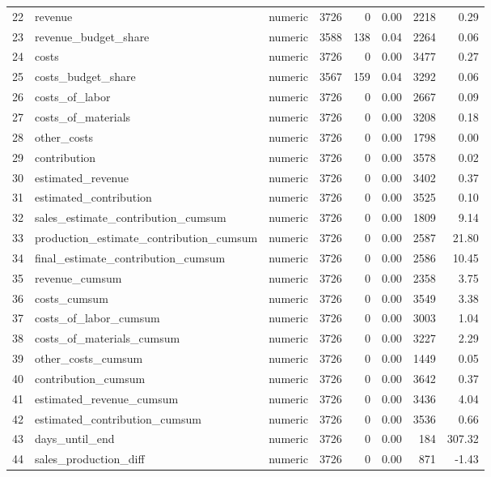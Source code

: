 \begin{sidewaystable}[ht]
\begin{tabular}{rllrrrrr}
  22 & revenue & numeric & 3726 &   0 & 0.00 & 2218 & 0.29 \\ 
  23 & revenue\_budget\_share & numeric & 3588 & 138 & 0.04 & 2264 & 0.06 \\ 
  24 & costs & numeric & 3726 &   0 & 0.00 & 3477 & 0.27 \\ 
  25 & costs\_budget\_share & numeric & 3567 & 159 & 0.04 & 3292 & 0.06 \\ 
  26 & costs\_of\_labor & numeric & 3726 &   0 & 0.00 & 2667 & 0.09 \\ 
  27 & costs\_of\_materials & numeric & 3726 &   0 & 0.00 & 3208 & 0.18 \\ 
  28 & other\_costs & numeric & 3726 &   0 & 0.00 & 1798 & 0.00 \\ 
  29 & contribution & numeric & 3726 &   0 & 0.00 & 3578 & 0.02 \\ 
  30 & estimated\_revenue & numeric & 3726 &   0 & 0.00 & 3402 & 0.37 \\ 
  31 & estimated\_contribution & numeric & 3726 &   0 & 0.00 & 3525 & 0.10 \\ 
  32 & sales\_estimate\_contribution\_cumsum & numeric & 3726 &   0 & 0.00 & 1809 & 9.14 \\ 
  33 & production\_estimate\_contribution\_cumsum & numeric & 3726 &   0 & 0.00 & 2587 & 21.80 \\ 
  34 & final\_estimate\_contribution\_cumsum & numeric & 3726 &   0 & 0.00 & 2586 & 10.45 \\ 
  35 & revenue\_cumsum & numeric & 3726 &   0 & 0.00 & 2358 & 3.75 \\ 
  36 & costs\_cumsum & numeric & 3726 &   0 & 0.00 & 3549 & 3.38 \\ 
  37 & costs\_of\_labor\_cumsum & numeric & 3726 &   0 & 0.00 & 3003 & 1.04 \\ 
  38 & costs\_of\_materials\_cumsum & numeric & 3726 &   0 & 0.00 & 3227 & 2.29 \\ 
  39 & other\_costs\_cumsum & numeric & 3726 &   0 & 0.00 & 1449 & 0.05 \\ 
  40 & contribution\_cumsum & numeric & 3726 &   0 & 0.00 & 3642 & 0.37 \\ 
  41 & estimated\_revenue\_cumsum & numeric & 3726 &   0 & 0.00 & 3436 & 4.04 \\ 
  42 & estimated\_contribution\_cumsum & numeric & 3726 &   0 & 0.00 & 3536 & 0.66 \\ 
  43 & days\_until\_end & numeric & 3726 &   0 & 0.00 & 184 & 307.32 \\ 
  44 & sales\_production\_diff & numeric & 3726 &   0 & 0.00 & 871 & -1.43 \\ 

\end{tabular}
\end{sidewaystable}
